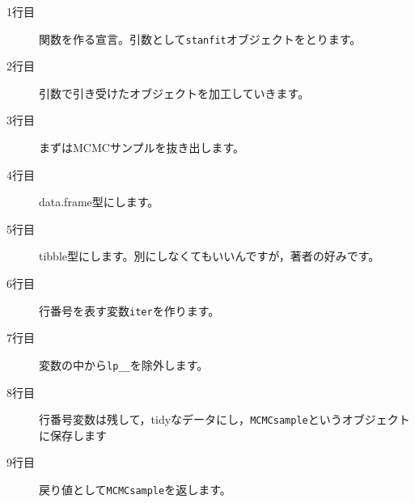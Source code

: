 \begin{description}
	\item[1行目] 関数を作る宣言。引数として\verb|stanfit|オブジェクトをとります。
	\item[2行目] 引数で引き受けたオブジェクトを加工していきます。
	\item[3行目] まずはMCMCサンプルを抜き出します。
	\item[4行目] data.frame型にします。
	\item[5行目] tibble型にします。別にしなくてもいいんですが，著者の好みです。
	\item[6行目] 行番号を表す変数\verb|iter|を作ります。
	\item[7行目] 変数の中から\verb|lp__|を除外します。
	\item[8行目] 行番号変数は残して，tidyなデータにし，\verb|MCMCsample|というオブジェクトに保存します
	\item[9行目] 戻り値として\verb|MCMCsample|を返します。
\end{description}
